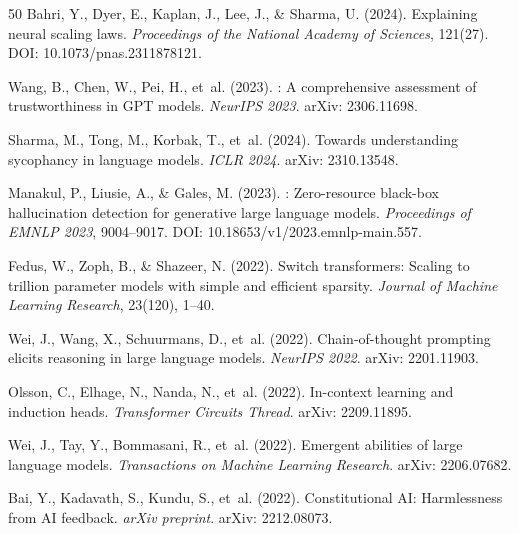 \documentclass[11pt,a4paper]{article}
\begin{document}
\begin{thebibliography}{50}
Bahri, Y., Dyer, E., Kaplan, J., Lee, J., \& Sharma, U. (2024).
\newblock Explaining neural scaling laws.
\newblock \emph{Proceedings of the National Academy of Sciences}, 121(27).
\newblock DOI: 10.1073/pnas.2311878121.

Wang, B., Chen, W., Pei, H., et~al. (2023).
: A comprehensive assessment of trustworthiness in {GPT} models.
\newblock \emph{NeurIPS 2023}.
\newblock arXiv: 2306.11698.

Sharma, M., Tong, M., Korbak, T., et~al. (2024).
\newblock Towards understanding sycophancy in language models.
\newblock \emph{ICLR 2024}.
\newblock arXiv: 2310.13548.

Manakul, P., Liusie, A., \& Gales, M. (2023).
: Zero-resource black-box hallucination detection for generative large language models.
\newblock \emph{Proceedings of EMNLP 2023}, 9004--9017.
\newblock DOI: 10.18653/v1/2023.emnlp-main.557.

Fedus, W., Zoph, B., \& Shazeer, N. (2022).
\newblock Switch transformers: Scaling to trillion parameter models with simple and efficient sparsity.
\newblock \emph{Journal of Machine Learning Research}, 23(120), 1--40.

Wei, J., Wang, X., Schuurmans, D., et~al. (2022).
\newblock Chain-of-thought prompting elicits reasoning in large language models.
\newblock \emph{NeurIPS 2022}.
\newblock arXiv: 2201.11903.

Olsson, C., Elhage, N., Nanda, N., et~al. (2022).
\newblock In-context learning and induction heads.
\newblock \emph{Transformer Circuits Thread}.
\newblock arXiv: 2209.11895.

Wei, J., Tay, Y., Bommasani, R., et~al. (2022).
\newblock Emergent abilities of large language models.
\newblock \emph{Transactions on Machine Learning Research}.
\newblock arXiv: 2206.07682.

Bai, Y., Kadavath, S., Kundu, S., et~al. (2022).
\newblock Constitutional {AI}: Harmlessness from {AI} feedback.
\newblock \emph{arXiv preprint}.
\newblock arXiv: 2212.08073.


\end{thebibliography}
\end{document}
